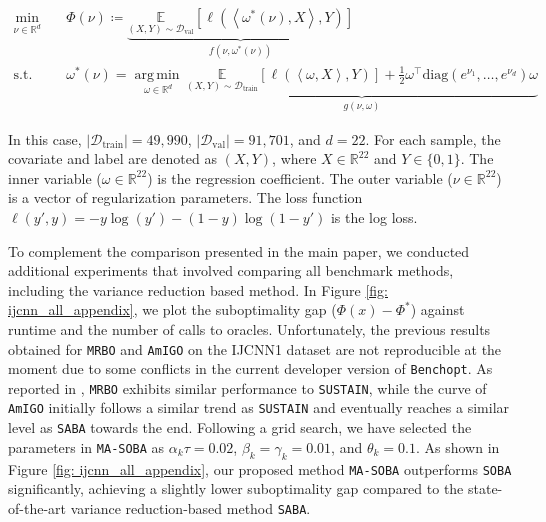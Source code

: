\documentclass[10pt]{article}
\theoremstyle{remark}
\newcommand{\cD}{\mathcal{D}}
\newcommand{\realset}{\mathbb{R}}
\newcommand{\diag}[1]{\mathrm{diag}\left(#1\right)}
\newcommand{\E}{\mathbb{E}}
\DeclareMathOperator*{\argmin}{arg\,min\,}
\def\<#1,#2>{\left\langle #1,#2\right\rangle}
\begin{document}
\begin{equation}
\begin{split}
    \underset{\nu\in\realset^d}{\min}&\quad  \Phi(\nu) \coloneqq  \underbrace{\underset{(X, Y) \sim \cD_{\text{val}}}{\E} \left[\ell\left(\<\omega^*(\nu), X> , Y\right)\right]}_{f(\nu, \omega^*(\nu))}\\
    \text{s.t.} &\quad \omega^*(\nu) =\underset{\omega\in\realset^d}{\argmin} \underbrace{\underset{(X, Y) \sim \cD_{\text{train}}}{\E} \left[\ell\left(\<\omega, X>, Y\right)\right] + \frac{1}{2} \omega^\top \diag{e^{\nu_1}, \dots, e^{\nu_d}} \omega}_{g(\nu, \omega)}
\end{split}    
\end{equation}

In this case, $|\cD_{\text{train}}| = 49,990$, $|\cD_{\text{val}}| = 91,701$, and $d=22$. For each sample, the covariate and label are denoted as $(X, Y)$, where $X\in\realset^{22}$ and $Y\in \{0,1\}$. The inner variable ($\omega\in\realset^{22}$) is the regression coefficient. The outer variable ($\nu\in\realset^{22}$) is a vector of regularization parameters. The loss function $\ell(y', y) = -y\log (y') - (1-y) \log(1-y')$ is the log loss.

To complement the comparison presented in the main paper, we conducted additional experiments that involved comparing all benchmark methods, including the variance reduction based method. In Figure \ref{fig: ijcnn_all_appendix}, we plot the suboptimality gap ($\Phi(x) - \Phi^*$) against runtime and the number of calls to oracles. Unfortunately, the previous results obtained for \texttt{MRBO} and \texttt{AmIGO} on the IJCNN1 dataset are not reproducible at the moment due to some conflicts in the current developer version of \texttt{Benchopt}. As reported in \cite{dagreou2022framework}, \texttt{MRBO} exhibits similar performance to \texttt{SUSTAIN}, while the curve of \texttt{AmIGO} initially follows a similar trend as \texttt{SUSTAIN} and eventually reaches a similar level as \texttt{SABA} towards the end. Following a grid search, we have selected the parameters in \texttt{MA-SOBA} as $\alpha_k\tau = 0.02$, $\beta_k=\gamma_k=0.01$, and $\theta_k = 0.1$. As shown in Figure \ref{fig: ijcnn_all_appendix}, our proposed method \texttt{MA-SOBA} outperforms \texttt{SOBA} significantly, achieving a slightly lower suboptimality gap compared to the state-of-the-art variance reduction-based method \texttt{SABA}. 
\end{document}
